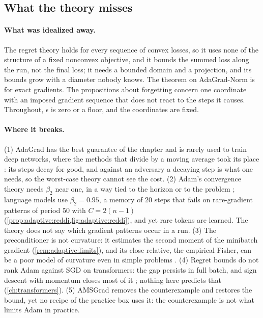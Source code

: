 \begin{refsection}
\section{What the theory misses}\label{sec:adaptive:misses}

\paragraph{What was idealized away.} The regret theory holds for every sequence of convex losses, so it uses none of the structure of a fixed nonconvex objective, and it bounds the summed loss along the run, not the final loss; it needs a bounded domain and a projection, and its bounds grow with a diameter nobody knows. The theorem on AdaGrad-Norm is for exact gradients. The propositions about forgetting concern one coordinate with an imposed gradient sequence that does not react to the steps it causes. Throughout, $\epsilon$ is zero or a floor, and the coordinates are fixed.

\paragraph{Where it breaks.} (1) AdaGrad has the best guarantee of the chapter and is rarely used to train deep networks, where the methods that divide by a moving average took its place \parencite{TielemanHinton2012,KingmaBa2015}: its steps decay for good, and against an adversary a decaying step is what one needs, so the worst-case theory cannot see the cost. (2) Adam's convergence theory needs $\beta_2$ near one, in a way tied to the horizon \parencite{DefossezEtAl2022} or to the problem \parencite{ZhangEtAl2022}; language models use $\beta_2=0.95$, a memory of $20$ steps that fails on rare-gradient patterns of period $50$ with $C=2(n-1)$ (\cref{prop:adaptive:reddi,fig:adaptive:reddi}), and yet rare tokens are learned. The theory does not say which gradient patterns occur in a run. (3) The preconditioner is not curvature: it estimates the second moment of the minibatch gradient (\cref{rem:adaptive:limits}), and its close relative, the empirical Fisher, can be a poor model of curvature even in simple problems \parencite{KunstnerHennigBalles2019}. (4) Regret bounds do not rank Adam against SGD on transformers: the gap persists in full batch, and sign descent with momentum closes most of it \parencite{KunstnerEtAl2023}; nothing here predicts that (\cref{ch:transformers}). (5) AMSGrad removes the counterexample and restores the bound, yet no recipe of the practice box uses it: the counterexample is not what limits Adam in practice.


\end{refsection}
